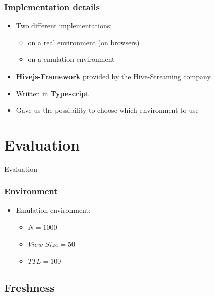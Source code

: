 \documentclass{beamer}
\begin{document}
\begin{frame}
\frametitle{Implementation details}
\begin{itemize}
  \item Two different implementations:
  \begin{itemize}
    \item on a real environment (on browsers)
    \item on a emulation environment
  \end{itemize}
  \item \textbf{Hivejs-Framework} provided by the Hive-Streaming company
  \item Written in \textbf{Typescript}
  \item Gave us the possibility to choose which environment to use
\end{itemize}


\end{frame}
\section{Evaluation}

\begin{frame}[c]
\Huge{\centerline{Evaluation}}

\end{frame}

\begin{frame}\frametitle{Environment}
\begin{itemize}
  \item Emulation environment:
  \begin{itemize}
    \item $N = 1000$
    \item $View$ $Size = 50$
    \item $TTL = 100$
  \end{itemize}

\end{itemize}

\end{frame}

\subsection{Freshness}
\end{document}

